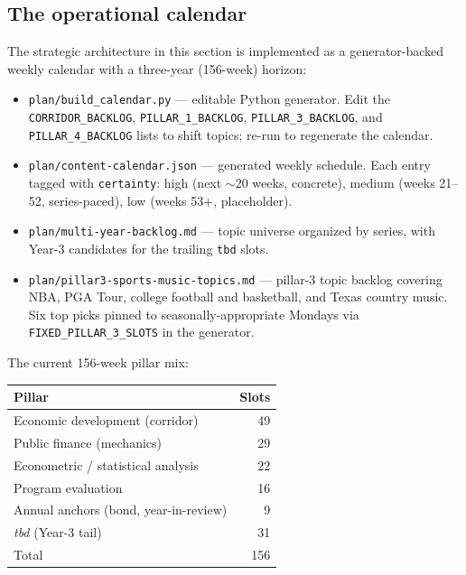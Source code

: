 \documentclass[11pt]{article}
\begin{document}
\subsection{The operational calendar}

The strategic architecture in this section is implemented as a
generator-backed weekly calendar with a three-year (156-week)
horizon:

\begin{itemize}
\item \texttt{plan/build\_calendar.py} --- editable Python
generator. Edit the \texttt{CORRIDOR\_BACKLOG},
\texttt{PILLAR\_1\_BACKLOG}, \texttt{PILLAR\_3\_BACKLOG}, and
\texttt{PILLAR\_4\_BACKLOG} lists to shift topics; re-run to
regenerate the calendar.
\item \texttt{plan/content-calendar.json} --- generated weekly
schedule. Each entry tagged with \texttt{certainty}: high (next
$\sim$20 weeks, concrete), medium (weeks 21--52, series-paced),
low (weeks 53+, placeholder).
\item \texttt{plan/multi-year-backlog.md} --- topic universe
organized by series, with Year-3 candidates for the trailing
\texttt{tbd} slots.
\item \texttt{plan/pillar3-sports-music-topics.md} --- pillar-3
topic backlog covering NBA, PGA Tour, college football and
basketball, and Texas country music. Six top picks pinned to
seasonally-appropriate Mondays via \texttt{FIXED\_PILLAR\_3\_SLOTS}
in the generator.
\end{itemize}

The current 156-week pillar mix:
\begin{center}
\small
\begin{tabular}{lr}
\toprule
Pillar & Slots \\
\midrule
Economic development (corridor)      & 49 \\
Public finance (mechanics)           & 29 \\
Econometric / statistical analysis   & 22 \\
Program evaluation                   & 16 \\
Annual anchors (bond, year-in-review) &  9 \\
\textit{tbd} (Year-3 tail)           & 31 \\
\midrule
Total                                & 156 \\
\bottomrule
\end{tabular}
\end{center}
\end{document}
